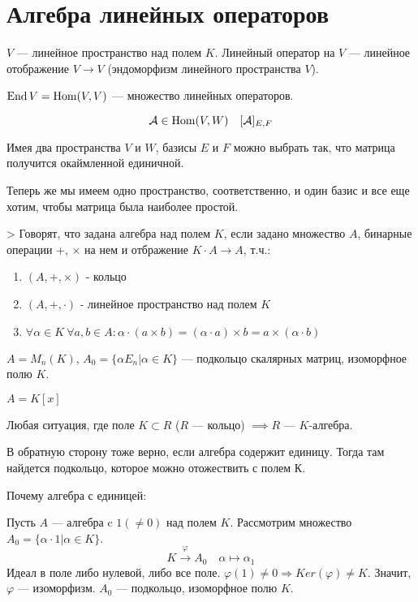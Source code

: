 \documentclass[main]{subfiles}
\begin{document}
\chapter{Алгебра линейных операторов} 
\begin{definition} [Алгебра]
$V$ — линейное пространство над полем $K$. 
Линейный оператор на $V$ — линейное отображение $V \to V$ (эндоморфизм линейного пространства $V$).
\end{definition} 
\begin{definition} 
$\operatorname{End} V = \operatorname{Hom}(V, V)$ —  множество линейных операторов.
\end{definition}

\[\mathcal{A} \in \operatorname{Hom} (V, W) \quad [\mathcal{A}]_{E,F}\]

Имея два пространства $V$ и $W$, базисы $E$ и $F$ можно выбрать так, что матрица получится окаймленной единичной.

Теперь же мы имеем одно пространство, соответственно, и один базис и все еще хотим, чтобы матрица была наиболее простой. 

\begin{definition}>
    Говорят, что задана алгебра над полем $K$, если задано множество $A$, бинарные операции +, $\times$ на нем и отбражение $K \cdot A \to A$, т.ч.:
    \begin{enumerate}
        \item $(A,+, \times)$ - кольцо 
        \item $(A,+, \cdot)$ - линейное пространство над полем $K$
        \item $\forall \alpha \in K \  \forall a, b \in A : \alpha \cdot (a \times b) = (\alpha \cdot a) \times b = a \times (\alpha \cdot b)$
    \end{enumerate}
\end{definition}

\begin{example}
    $A = M_n(K)$, 
    $A_0 = \{ \alpha E_n | \alpha \in K\}$ —  подкольцо скалярных матриц, изоморфное полю $K$.
\end{example}

\begin{example}
    $A = K[x]$
\end{example}   
\begin{example}
    Любая ситуация, где поле $K \subset R$ ($R$ —  кольцо) $\implies R$ — $K$-алгебра. 
    
    В обратную сторону тоже верно, если алгебра содержит единицу. Тогда там найдется подкольцо, которое можно отожествить с полем К.
    
    Почему алгебра с единицей: 

    Пусть $A$ —  алгебра c $1(\neq0)$ над полем $K$.
    Рассмотрим множество $A_0 = \{\alpha \cdot 1| \alpha \in K\}$. 
    \[K \xrightarrow{\varphi} A_0 \quad \alpha \mapsto \alpha_1\]
    Идеал в поле либо нулевой, либо все поле. 
    $\varphi(1) \neq 0 \Rightarrow Ker(\varphi)\neq K$. 
    Значит,  $\varphi$ — изоморфизм. $A_0$ — подкольцо, изоморфное полю $K$.
\end{example}
\end{document}
